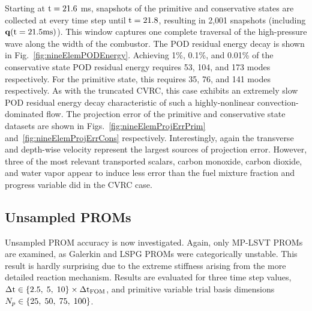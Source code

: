 Starting at $\text{t} = 21.6$ ms, snapshots of the primitive and conservative states are collected at every time step until $\text{t} = 21.8$, resulting in 2,001 snapshots (including $\mathbf{q}(\text{t} = 21.5 \text{ms})$). This window captures one complete traversal of the high-pressure wave along the width of the combustor. The POD residual energy decay is shown in Fig.~\ref{fig:nineElemPODEnergy}. Achieving 1\%, 0.1\%, and 0.01\% of the conservative state POD residual energy requires 53, 104, and 173 modes respectively. For the primitive state, this requires 35, 76, and 141 modes respectively. As with the truncated CVRC, this case exhibits an extremely slow POD residual energy decay characteristic of such a highly-nonlinear convection-dominated flow. The projection error of the primitive and conservative state datasets are shown in Figs.~\ref{fig:nineElemProjErrPrim} and~\ref{fig:nineElemProjErrCons} respectively. Interestingly, again the transverse and depth-wise velocity represent the largest sources of projection error. However, three of the most relevant transported scalars, carbon monoxide, carbon dioxide, and water vapor appear to induce less error than the fuel mixture fraction and progress variable did in the CVRC case.

\subsection{Unsampled PROMs}

Unsampled PROM accuracy is now investigated. Again, only MP-LSVT PROMs are examined, as Galerkin and LSPG PROMs were categorically unstable. This result is hardly surprising due to the extreme stiffness arising from the more detailed reaction mechanism. Results are evaluated for three time step values, $\Delta \text{t} \in \{2.5, \; 5, \; 10\} \times \Delta \text{t}_{\text{FOM}}$, and primitive variable trial basis dimensions $N_p \in \{25, \; 50, \; 75, \; 100\}$. 

